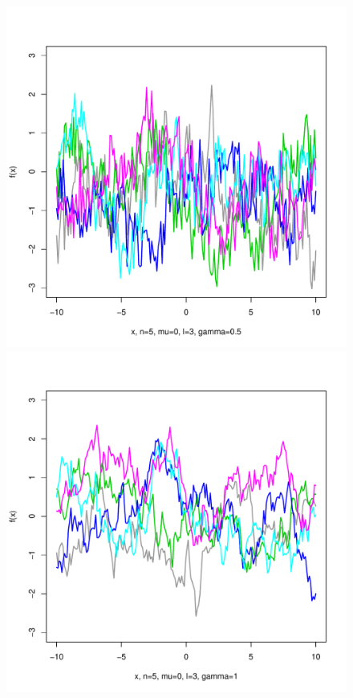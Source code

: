 \documentclass[12pt,letterpaper]{article}
\begin{document}
\begin{figure}
\begin{center}
\includegraphics[scale=0.2]{hw321/n5-m0-l3-g1.pdf}
\includegraphics[scale=0.2]{hw321/n5-m0-l3-g2.pdf}

\end{center}
\end{figure}
\end{document}
